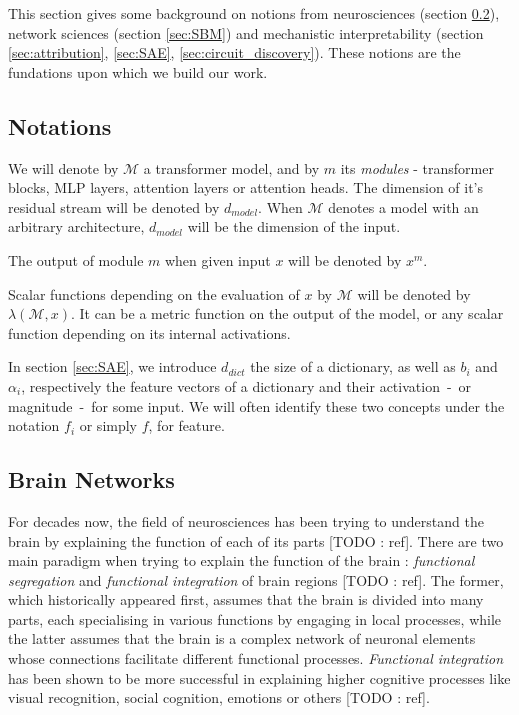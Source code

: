 \documentclass{article}
\begin{document}
This section gives some background on notions from neurosciences (section \ref{sec:brain_networks}), network sciences (section \ref{sec:SBM}) and mechanistic interpretability (section \ref{sec:attribution}, \ref{sec:SAE}, \ref{sec:circuit_discovery}). These notions are the fundations upon which we build our work.

\subsection{Notations}

We will denote by $\mathcal{M}$ a transformer model, and by $m$ its \textit{modules} - transformer blocks, MLP layers, attention layers or attention heads. The dimension of it's residual stream will be denoted by $d_{model}$. When $\mathcal{M}$ denotes a model with an arbitrary architecture, $d_{model}$ will be the dimension of the input.

The output of module $m$ when given input $x$ will be denoted by $x^m$.

Scalar functions depending on the evaluation of $x$ by $\mathcal{M}$ will be denoted by $\lambda(\mathcal{M}, x)$. It can be a metric function on the output of the model, or any scalar function depending on its internal activations.

In section \ref{sec:SAE}, we introduce $d_{dict}$ the size of a dictionary, as well as $b_i$ and $\alpha_i$, respectively the feature vectors of a dictionary and their activation~-~or magnitude~-~for some input. We will often identify these two concepts under the notation $f_i$ or simply $f$, for feature.

\subsection{Brain Networks}
\label{sec:brain_networks}

For decades now, the field of neurosciences has been trying to understand the brain by explaining the function of each of its parts [TODO : ref]. There are two main paradigm when trying to explain the function of the brain : \textit{functional segregation} and \textit{functional integration} of brain regions [TODO : ref]. The former, which historically appeared first, assumes that the brain is divided into many parts, each specialising in various functions by engaging in local processes, while the latter assumes that the brain is a complex network of neuronal elements whose connections facilitate different functional processes. \textit{Functional integration} has been shown to be more successful in explaining higher cognitive processes like visual recognition, social cognition, emotions or others [TODO : ref].%
\end{document}
